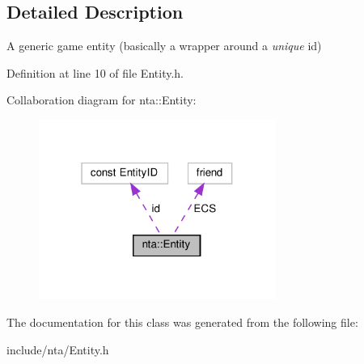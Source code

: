 \subsection{Detailed Description}
A generic game entity (basically a wrapper around a {\itshape unique} id) 

Definition at line 10 of file Entity.\+h.



Collaboration diagram for nta\+:\+:Entity\+:\nopagebreak
\begin{figure}[H]
\begin{center}
\leavevmode
\includegraphics[width=220pt]{db/dc2/classnta_1_1Entity__coll__graph}
\end{center}
\end{figure}


The documentation for this class was generated from the following file\+:\begin{DoxyCompactItemize}
\item 
include/nta/Entity.\+h\end{DoxyCompactItemize}
